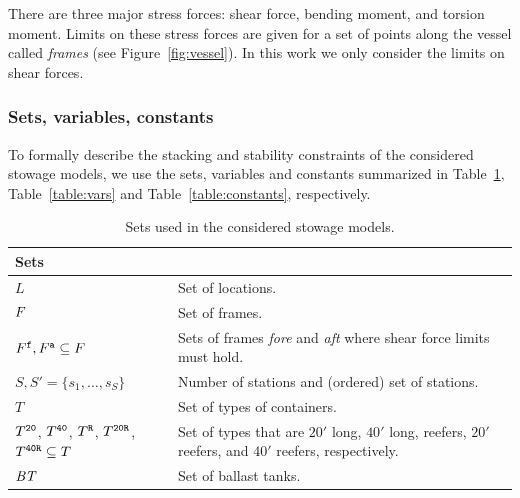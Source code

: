 There are three major stress forces: shear force, bending moment, and torsion moment. Limits on these stress forces are given for a set of points along the vessel called \emph{frames} (see Figure~\ref{fig:vessel}). In this work we only consider the limits on shear forces.


\subsubsection*{Sets, variables, constants}
To formally describe the stacking and stability constraints of the considered stowage models, we use the sets, variables and constants summarized in Table~\ref{table:sets}, Table~\ref{table:vars} and Table~\ref{table:constants}, respectively.
\begin{table}[p]
\centering
\begin{tabular}{p{5cm}p{7.5cm}}%
\multicolumn{2}{l}{\textbf{Sets}}\\
\hline\noalign{\smallskip}
$L$ 
	& Set of locations.\\
$F$
	&Set of frames.\\
$F^{\texttt{f}},F^{\texttt{a}}\subseteq F$
	&Sets of frames \emph{fore} and \emph{aft} where shear force limits must hold.\\
$S, S' = \{s_1,\ldots, s_S\}$ 
	&Number of stations and (ordered) set of stations.\\
$T$
	&Set of types of containers.\\ 
$T^{\texttt{20}}$, $T^{\texttt{40}}$, $T^{\texttt{R}}$, $T^{\texttt{20R}}$, $T^{\texttt{40R}}\subseteq T$ 
	&Set of types that are $20'$ long, $40'$ long, reefers, $20'$ reefers, and $40'$ reefers, respectively.\\ 
$\mathit{BT}$ 
	& Set of ballast tanks.\\
\end{tabular}
\caption{Sets used in the considered stowage models.}
\label{table:sets}
\end{table}
%
